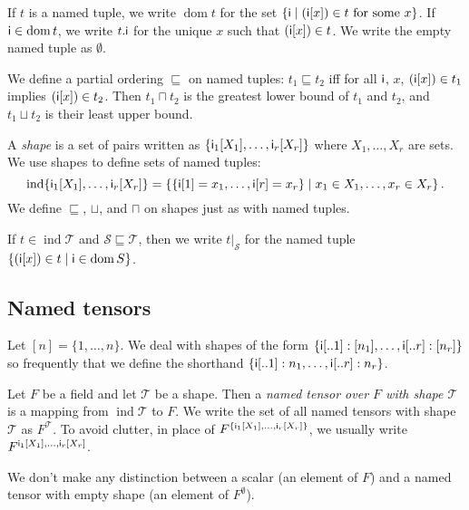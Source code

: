 \documentclass{article}
\newcommand{\tuple}[1]{\{#1\}}
\DeclareMathOperator{\tupledom}{dom}
\DeclareMathOperator{\tupleshape}{ind}
\newcommand{\tupleproj}[2]{#1.\name{#2}}
\newcommand{\tuplerestrict}[2]{\left.#1\right|_{#2}}
\begin{document}
If $t$ is a named tuple, we write $\tupledom{t}$ for the set $\{\mathsf{i} \mid \text{$(\mathsf{i}[x]) \in t$ for some $x$} \}$. If $\name{i} \in \tupledom{t}$, we write $\tupleproj{t}{i}$ for the unique $x$ such that $(\mathsf{i}[x]) \in t$. We write the empty named tuple as $\emptyset$.

We define a partial ordering $\sqsubseteq$ on named tuples: $t_1 \sqsubseteq t_2$ iff for all $\mathsf{i}$, $x$, $(\mathsf{i}[x]) \in t_1$ implies $(\mathsf{i}[x]) \in t_2$. Then $t_1 \sqcap t_2$ is the greatest lower bound of $t_1$ and $t_2$, and $t_1 \sqcup t_2$ is their least upper bound.

A \emph{shape} is a set of pairs written as $\tuple{\nset{i\sub{1}}{X_1}, \ldots, \nset{i\sub{r}}{X_r}}$ where $X_1, \ldots, X_r$ are sets. We use shapes to define sets of named tuples:
\begin{equation*}
\tupleshape \tuple{\nset{i\sub{1}}{X_1}, \ldots, \nset{i\sub{r}}{X_r}} = \left\{\tuple{\nidx{i}{1}=x_1, \ldots, \nidx{i}{r}=x_r} \mid x_1 \in X_1, \ldots, x_r \in X_r\right\}.
\end{equation*}
We define $\sqsubseteq$, $\sqcup$, and $\sqcap$ on shapes just as with named tuples.

If $t \in \tupleshape \mathcal{T}$ and $\mathcal{S} \sqsubseteq \mathcal{T}$, then we write $\tuplerestrict{t}{\mathcal{S}}$ for the named tuple $\{(\nidx{i}{x}) \in t \mid \name{i} \in \tupledom{S}\}$.

\subsection{Named tensors}

Let $[n] = \{1, \ldots, n\}$. We deal with shapes of the form $\tuple{\nset{i}{..1}: [n_1], \ldots, \nset{i}{..r}: [n_r]}$ so frequently that we define the shorthand $\tuple{\nset{i}{..1}: n_1, \ldots, \nset{i}{..r}: n_r}$.

Let $F$ be a field and let $\mathcal{T}$ be a shape. Then a \emph{named tensor over $F$ with shape $\mathcal{T}$} is a mapping from $\tupleshape \mathcal{T}$ to $F$. We write the set of all named tensors with shape $\mathcal{T}$ as $F^{\mathcal{T}}$. To avoid clutter, in place of $F^{\tuple{\nset{i\sub{1}}{X_1}, \ldots, \nset{i\sub{r}}{X_r}}}$, we usually write $F^{\mathsf{i_\text{$1$}}[X_1], \ldots, \mathsf{i_\text{$r$}}[X_r]}$.

We don't make any distinction between a scalar (an element of $F$) and a named tensor with empty shape (an element of $F^\emptyset$).
\end{document}
